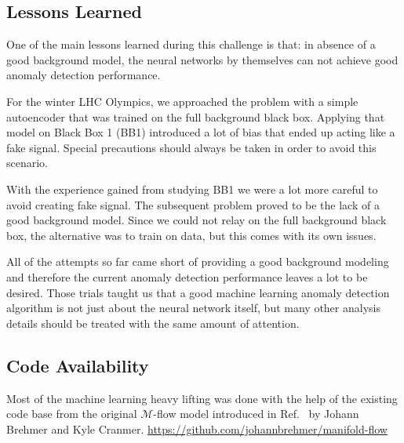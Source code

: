 \documentclass[letterpaper,11pt]{article}
\begin{document}

\subsection{Lessons Learned}
\label{sec:lessons}

One of the main lessons learned during this challenge is that: in absence of a good background model, the neural networks by themselves can not achieve good anomaly detection performance. 

For the winter LHC Olympics, we approached the problem with a simple autoencoder that was trained on the full background black box. Applying that model on Black Box 1 (BB1) introduced a lot of bias that ended up acting like a fake signal. Special precautions should always be taken in order to avoid this scenario.

With the experience gained from studying BB1 we were a lot more careful to avoid creating fake signal. The subsequent problem proved to be the lack of a good background model. Since we could not relay on the full background black box, the alternative was to train on data, but this comes with its own issues. 

All of the attempts so far came short of providing a good background modeling and therefore the current anomaly detection performance leaves a lot to be desired. Those trials taught us that a good machine learning anomaly detection algorithm is not just about the neural network itself, but many other analysis details should be treated with the same amount of attention.



\subsection{Code Availability}
\label{code:code}

Most of the machine learning heavy lifting was done with the help of the existing code base from the original $\mathcal{M}$-flow model introduced in Ref.~\cite{Brehmer:2020vwc} by Johann Brehmer and Kyle Cranmer. \href{https://github.com/johannbrehmer/manifold-flow}{https://github.com/johannbrehmer/manifold-flow} 
\end{document}
